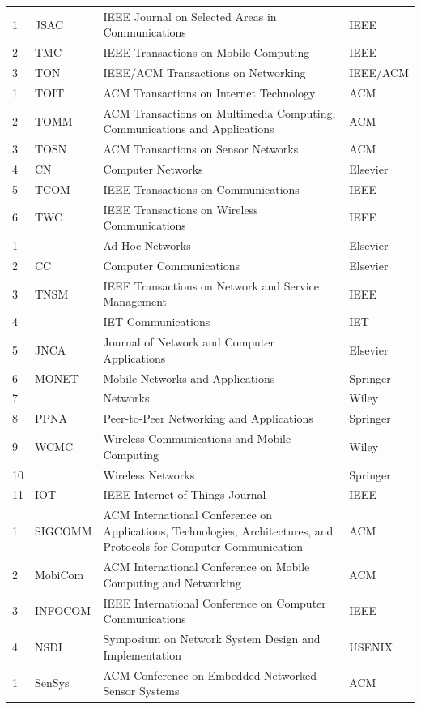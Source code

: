 \documentclass[QingNianC, vlined, timesmathnogreek]{nsfc}
\begin{document}
\begin{longtable}{p{2em} p{4.5em} p{20em} p{6em}}
		1 & JSAC & IEEE Journal on Selected Areas in Communications & IEEE \\
		2 & TMC & IEEE Transactions on Mobile Computing & IEEE \\
		3 & TON & IEEE/ACM Transactions on Networking & IEEE/ACM \\
		1 & TOIT & ACM Transactions on Internet Technology & ACM \\
		2 & TOMM & ACM Transactions on Multimedia Computing, Communications and Applications & ACM \\
		3 & TOSN & ACM Transactions on Sensor Networks & ACM \\
		4 & CN & Computer Networks & Elsevier \\
		5 & TCOM & IEEE Transactions on Communications & IEEE \\
		6 & TWC & IEEE Transactions on Wireless Communications & IEEE \\
		1 & & Ad Hoc Networks & Elsevier \\
		2 & CC & Computer Communications & Elsevier \\
		3 & TNSM & IEEE Transactions on Network and Service Management & IEEE \\
		4 & & IET Communications & IET \\
		5 & JNCA & Journal of Network and Computer Applications & Elsevier \\
		6 & MONET & Mobile Networks and Applications & Springer \\
		7 & & Networks & Wiley \\
		8 & PPNA & Peer-to-Peer Networking and Applications & Springer \\
		9 & WCMC & Wireless Communications and Mobile Computing & Wiley \\
		10 & & Wireless Networks & Springer \\
		11 & IOT & IEEE Internet of Things Journal & IEEE \\
		1 & SIGCOMM & ACM International Conference on Applications, Technologies, Architectures, and Protocols for Computer Communication & ACM \\
		2 & MobiCom & ACM International Conference on Mobile Computing and Networking & ACM \\
		3 & INFOCOM & IEEE International Conference on Computer Communications & IEEE \\
		4 & NSDI & Symposium on Network System Design and Implementation & USENIX \\
		1 & SenSys & ACM Conference on Embedded Networked Sensor Systems & ACM \\

\end{longtable}
\end{document}
